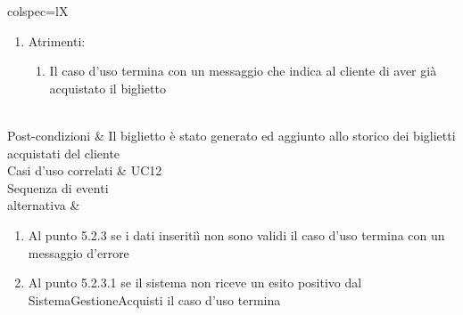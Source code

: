 \begin{table}[H]
\begin{scenery}{colspec=lX}
\begin{enumerate}[label=\arabic*.]
\begin{enumerate}[label*=\arabic*.]
\begin{enumerate}[label*=\arabic*.]
					\end{enumerate}
				\end{enumerate}
				\item Atrimenti:
				\begin{enumerate}[label*=\arabic*.]
					\item Il caso d'uso termina con un messaggio che indica al cliente di aver già acquistato il biglietto
				\end{enumerate}
			\end{enumerate} \\
		Post-condizioni & Il biglietto è stato generato ed aggiunto allo storico dei biglietti acquistati del cliente\\
		Casi d'uso correlati & UC12 \\
		{Sequenza di eventi \\ alternativa} &
			\begin{enumerate}[label=\arabic*.]
				\item Al punto 5.2.3 se i dati inseritiì non sono validi il caso d'uso termina con un messaggio d'errore
				\item Al punto 5.2.3.1 se il sistema non riceve un esito positivo dal SistemaGestioneAcquisti il caso d'uso termina
			\end{enumerate} \\
	\end{scenery}
\end{table}